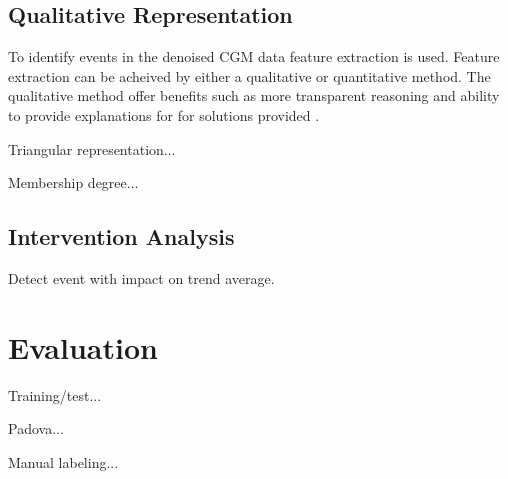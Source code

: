 

\subsection{Qualitative Representation}

To identify events in the denoised CGM data feature extraction is used.
Feature extraction can be acheived by either a qualitative or quantitative method.
The qualitative method offer benefits such as more transparent reasoning and ability to provide explanations for for solutions provided \parencite{Ven2003}.

Triangular representation...

Membership degree...

\subsection{Intervention Analysis}

Detect event with impact on trend average.

\section{Evaluation}

Training/test...

Padova...

Manual labeling...
